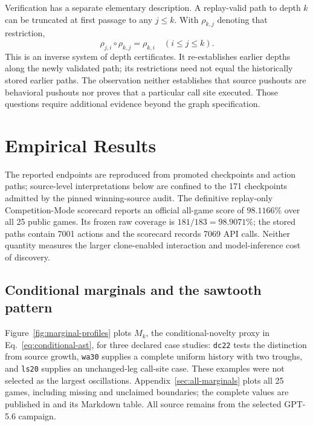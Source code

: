 \documentclass[11pt]{article}
\theoremstyle{definition}
\theoremstyle{remark}
\begin{document}
Verification has a separate elementary description. A replay-valid path to depth
$k$ can be truncated at first passage to any $j\le k$. With $\rho_{k,j}$ denoting
that restriction,
\begin{equation}
 \rho_{j,i}\circ\rho_{k,j}=\rho_{k,i}\quad(i\le j\le k).
 \label{eq:certificate-coherence}
\end{equation}
This is an inverse system of depth certificates. It re-establishes earlier depths
along the newly validated path; its restrictions need not equal the historically
stored earlier paths. The observation neither establishes that source pushouts
are behavioral pushouts nor proves that a particular call site executed. Those
questions require additional evidence beyond the graph specification.

\section{Empirical Results}\label{sec:results}
The reported endpoints are reproduced from promoted checkpoints and action paths;
source-level interpretations below are confined to the 171 checkpoints admitted by the
pinned winning-source audit. The definitive replay-only Competition-Mode scorecard reports an official
all-game score of $98.1166\%$ over all 25 public games. Its frozen raw
coverage is $181/183=98.9071\%$; the stored paths contain 7001 actions and the
scorecard records 7069 API calls. Neither quantity measures the larger clone-enabled
interaction and model-inference cost of discovery.

\subsection{Conditional marginals and the sawtooth pattern}
\label{sec:marginal-results}
Figure~\ref{fig:marginal-profiles} plots $M_k$, the conditional-novelty proxy in
Eq.~\eqref{eq:conditional-ast}, for three declared case studies: \texttt{dc22}
tests the distinction from source growth, \texttt{wa30} supplies a complete uniform
history with two troughs, and \texttt{ls20} supplies an unchanged-leg call-site case.
These examples were not selected as the largest oscillations. Appendix~\ref{sec:all-marginals}
plots all 25 games, including missing and unclaimed boundaries; the complete values
are published in  and its
Markdown table. All source remains from the selected GPT-5.6 campaign.
\end{document}

